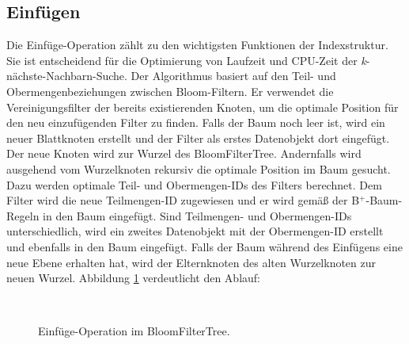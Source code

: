 \subsection{Einfügen}\label{sec:einfügen}
Die Einfüge-Operation zählt zu den wichtigsten Funktionen der Indexstruktur. Sie ist entscheidend für die Optimierung von Laufzeit und CPU-Zeit der \textit{k}-nächste-Nachbarn-Suche. Der Algorithmus basiert auf den Teil- und Obermengenbeziehungen zwischen Bloom-Filtern. Er verwendet die Vereinigungsfilter der bereits existierenden Knoten, um die optimale Position für den neu einzufügenden Filter zu finden. Falls der Baum noch leer ist, wird ein neuer Blattknoten erstellt und der Filter als erstes Datenobjekt dort eingefügt. Der neue Knoten wird zur Wurzel des BloomFilterTree. Andernfalls wird ausgehend vom Wurzelknoten rekursiv die optimale Position im Baum gesucht. Dazu werden optimale Teil- und Obermengen-IDs des Filters berechnet. Dem Filter wird die neue Teilmengen-ID zugewiesen und er wird gemäß der B$^+$-Baum-Regeln in den Baum eingefügt. Sind Teilmengen- und Obermengen-IDs unterschiedlich, wird ein zweites Datenobjekt mit der Obermengen-ID erstellt und ebenfalls in den Baum eingefügt. Falls der Baum während des Einfügens eine neue Ebene erhalten hat, wird der Elternknoten des alten Wurzelknoten zur neuen Wurzel. Abbildung \ref{fig:pic7} verdeutlicht den Ablauf:  
\begin{figure}[hpbt]
  \centering
  \\
  \caption[Einfüge-Operation im BloomFilterTree]{Einfüge-Operation im BloomFilterTree.}\label{fig:pic7}
\end{figure}
